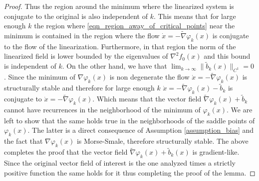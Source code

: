 \documentclass[article]{IEEEtran}
\theoremstyle{definition}
\begin{document}
\begin{proof}
 Thus the region around the minimum where the linearized system is conjugate to the original is also independent of $k$. This means that for large enough $k$ the region where \eqref{eqn_region_away_of_critical_points} near the minimum is contained in the region where the flow $\dot{x}=-\tilde{\nabla}\varphi_k(x)$ is conjugate to the flow of the linearization. Furthermore, in that region the norm of the linearized field is lower bounded by the eigenvalues of $\nabla^2f_0(x)$ and this bound is independent of $k$. On the other hand, we have that $\lim_{k\to\infty}\|\tilde{b}_k(x)\|_{C^1} =0$. Since the minimum of $\nabla \varphi_k(x)$ is non degenerate the flow $\dot{x}=-\tilde{\nabla}\varphi_k(x)$ is structurally stable and therefore for large enough $k$ $\dot{x}=-\tilde{\nabla}\varphi_k(x) -\tilde{b}_k$ is conjugate to $\dot{x}=-\tilde{\nabla}\varphi_k(x)$. Which means that the vector field $\tilde{\nabla}\varphi_k(x)+\tilde{b}_k$ cannot have recurrences in the neighborhood of the minimum of $ \varphi_k(x) $. We are left to show that the same holds true in the neighborhoods of the saddle points of $\varphi_k(x)$. The latter is a direct consequence of Assumption \ref{assumption_bias} and the fact that $\nabla \varphi_k(x)$ is Morse-Smale, therefore structurally stable. The above completes the proof that the vector field $\tilde{\nabla}\varphi_k(x)+\tilde{b}_k(x)$ is gradient-like. Since the original vector field of interest is the one analyzed times a strictly positive function the same holds for it thus completing the proof of the lemma.
%
%
\end{proof}
\end{document}
